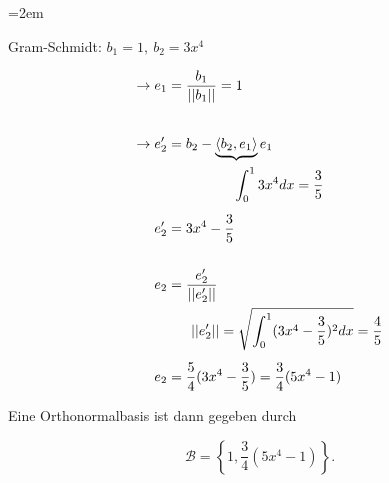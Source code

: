 \begin{solution}    

    \vspace{1\baselineskip}

    \leftskip=2em

    Gram-Schmidt: \( b_1 = 1, \ b_2 = 3x^4 \)

    \begin{equation*}
        \begin{aligned}
            \rightarrow e_1 &= \frac{b_1}{||b_1||} = 1 \\[2em]
            \rightarrow e_2' &= b_2 - \underbrace{\langle b_2,e_1 \rangle} e_1 \\
            & \hspace{1.65cm} \int_{0}^{1} 3x^4 dx = \frac{3}{5} \\[0.5em]
            e_2' &= 3x^4 - \frac{3}{5} \\[1.5em]
            e_2 &= \frac{e_2'}{||e_2'||} \\
            & \hspace{0.6cm} ||e_2'|| = \sqrt{\int_{0}^{1} (3x^4 - \frac{3}{5})^2 dx} = \frac{4}{5} \\[0.5em]
            e_2 &= \frac{5}{4} (3x^4 - \frac{3}{5}) = \frac{3}{4}(5x^4 - 1)
        \end{aligned}
    \end{equation*}

    \vspace{1\baselineskip}

    Eine Orthonormalbasis ist dann gegeben durch

    \begin{equation*}
        \mathcal{B} = \left\{ 1, \frac{3}{4}(5x^4 - 1) \right\}.
    \end{equation*}

\end{solution}
